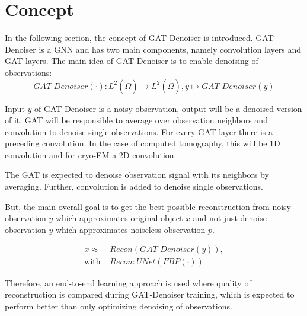 \section{Concept}


In the following section, the concept of GAT-Denoiser is introduced. 
GAT-Denoiser is a GNN and has two main components, namely convolution layers and GAT layers.
The main idea of GAT-Denoiser is to enable denoising of observations:
\begin{equation}
  \textit{GAT-Denoiser} (\cdot) : L^2(\tilde{\Omega}) \to  L^2(\tilde{\Omega}) , y \mapsto \textit{GAT-Denoiser} (y) 
\end{equation}


Input $y$ of GAT-Denoiser is a noisy observation, output will be a denoised version of it.
GAT will be responsible to average over observation neighbors and convolution to denoise single observations. 
For every GAT layer there is a preceding convolution. 
In the case of computed tomography, this will be 1D convolution and for cryo-EM a 2D convolution.

\begin{tcolorbox}[colback=red!5!white,colframe=red!75!black]
  The GAT is expected to denoise observation signal with its neighbors by averaging. 
  Further, convolution is added to denoise single observations.
\end{tcolorbox}


But, the main overall goal is to get the best possible reconstruction 
from noisy observation $y$ which approximates original object $x$ and 
not just denoise observation $y$ which approximates noiseless observation $p$.


\begin{equation}
  \begin{aligned}
    x \approx   &\textit{Recon} \left( \textit{GAT-Denoiser} \left( y \right) \right), \\
    \text{with } &\textit{Recon} : \textit{UNet} \left( \textit{FBP} \left( \cdot \right) \right)  
  \end{aligned}
\end{equation}

Therefore, an end-to-end learning approach is used where quality of reconstruction is 
compared during GAT-Denoiser training, which is expected to perform better than 
only optimizing denoising of observations.

